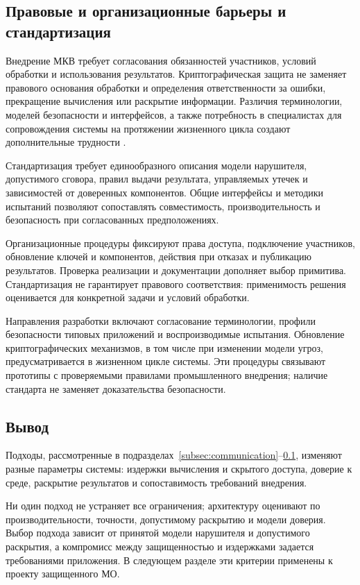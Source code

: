 \subsection{Правовые и организационные барьеры и стандартизация}
\label{subsec:standardization}

Внедрение МКВ требует согласования обязанностей участников, условий обработки и использования результатов. Криптографическая защита не заменяет правового основания обработки и определения ответственности за ошибки, прекращение вычисления или раскрытие информации. Различия терминологии, моделей безопасности и интерфейсов, а также потребность в специалистах для сопровождения системы на протяжении жизненного цикла создают дополнительные трудности \cite{01}\cite{13}.

Стандартизация требует единообразного описания модели нарушителя, допустимого сговора, правил выдачи результата, управляемых утечек и зависимостей от доверенных компонентов. Общие интерфейсы и методики испытаний позволяют сопоставлять совместимость, производительность и безопасность при согласованных предположениях.

Организационные процедуры фиксируют права доступа, подключение участников, обновление ключей и компонентов, действия при отказах и публикацию результатов. Проверка реализации и документации дополняет выбор примитива. Стандартизация не гарантирует правового соответствия: применимость решения оценивается для конкретной задачи и условий обработки.

Направления разработки включают согласование терминологии, профили безопасности типовых приложений и воспроизводимые испытания. Обновление криптографических механизмов, в том числе при изменении модели угроз, предусматривается в жизненном цикле системы. Эти процедуры связывают прототипы с проверяемыми правилами промышленного внедрения; наличие стандарта не заменяет доказательства безопасности.

\subsection{Вывод}

Подходы, рассмотренные в подразделах~\ref{subsec:communication}--\ref{subsec:standardization}, изменяют разные параметры системы: издержки вычисления и скрытого доступа, доверие к среде, раскрытие результатов и сопоставимость требований внедрения.

Ни один подход не устраняет все ограничения; архитектуру оценивают по производительности, точности, допустимому раскрытию и модели доверия. Выбор подхода зависит от принятой модели нарушителя и допустимого раскрытия, а компромисс между защищенностью и издержками задается требованиями приложения. В следующем разделе эти критерии применены к проекту защищенного МО.